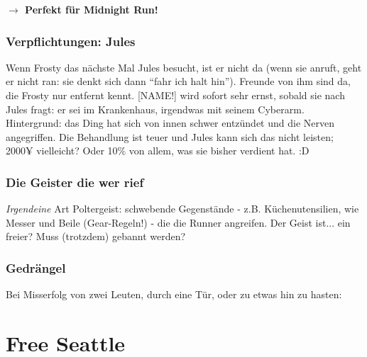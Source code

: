 \textbf{$\rightarrow$ Perfekt für Midnight Run!}



\subsubsection{Verpflichtungen: Jules}

Wenn Frosty das nächste Mal Jules besucht, ist er nicht da (wenn sie anruft, geht er nicht ran: sie denkt sich dann ``fahr ich halt hin''). Freunde von ihm sind da, die Frosty nur entfernt kennt. [NAME!] wird sofort sehr ernst, sobald sie nach Jules fragt: er sei im Krankenhaus, irgendwas mit seinem Cyberarm. Hintergrund: das Ding hat sich von innen schwer entzündet und die Nerven angegriffen. Die Behandlung ist teuer und Jules kann sich das nicht leisten; 2000¥ vielleicht? Oder 10\% von allem, was sie bisher verdient hat. :D


\subsubsection{Die Geister die wer rief}

\textit{Irgendeine} Art Poltergeist: schwebende Gegenstände - z.B. Küchenutensilien, wie Messer und Beile (Gear-Regeln!) - die die Runner angreifen. Der Geist ist... ein freier? Muss (trotzdem) gebannt werden?

\subsubsection{Gedrängel}

Bei Misserfolg von zwei Leuten, durch eine Tür, oder zu etwas hin zu hasten:







\section{Free Seattle}








